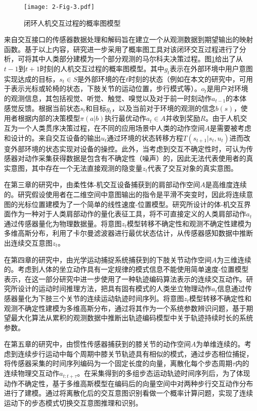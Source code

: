 \begin{figure}[htb]
    \centering
    \texttt{[image: 2-Fig-3.pdf]}
    \caption{闭环人机交互过程的概率图模型}
    \label{fig:2-3}
\end{figure}

来自交互接口的传感器数据处理和解码旨在建立一个从观测数据到期望输出的映射函数。基于以上内容，研究进一步采用了概率图工具对该闭环交互过程进行了分析，可将其中人类部分建模为一个部分观测的马尔科夫决策过程。图\ref{fig:2-3}给出了从$t-1$到$t+1$时刻的人机交互过程的概率图模型。其中${g_t}$表示在外部环境中用户意图实现达成的目标，${s_t} \in S$是外部环境的在$t$时刻的状态（例如在本文的研究中，可用于表示光标或轮椅的状态，下肢关节的运动位置，步行模式等）。${o_t}$是用户对环境的观测信息，其包括视觉、听觉、触觉、嗅觉以及对于前一时刻动作${a_{t - 1}}$的本体感觉反馈。根据当前状态${s_t}$和目标${g_t}$，以及当前对于环境的观测的信念$b(s)$，使用者根据内部的决策模型$\pi(a|b)$执行最优动作${a_t} \in A $并收到奖励$R$。由于人机交互为一个人类贯序决策过程，在不同的应用场景中人类的动作空间$A $是需要被考虑和设计的。来自交互设备的输出${u_t}$通过环境的状态转移方程$T({s_{t+1}}|{s_{t}},{u_{t}})$进而改变外部环境的状态实现对设备的操控。此外，当考虑到交互不确定性时，可认为传感器对动作采集获得数据是包含有不确定性（噪声）的，因此无法代表使用者的真实意图，其中存在一个无法直接观测的隐变量$z_t$代表了交互对象的真实意图。

在第三章的研究中，由柔性体-机交互设备捕获到的肩部动作空间$A $是高维度连续的。研究假设使用者在二维空间中意图输出的指令是平滑不突变时，因此将连续意图的光标位置建模为了一个简单的线性速度-位置模型。研究所设计的体-机交互界面作为一种对于人类肩部动作的量化表征工具，将不可直接定义的人类肩部动作${a_t}$通过传感器量化为物理数据量。将意图${z_t}$模型转移不确定性和观测不确定性建模为多维高斯分布，利用了卡尔曼滤波器进行最优状态估计，从传感器感知数据中推断出连续交互意图$z_t$。

在第四章的研究中，由光学运动捕捉系统捕获到的下肢关节动作空间$A $为三维连续的。考虑到人体的坐立动作具有一定规律的模式信息不能使用简单速度-位置模型表示，在这一部分研究中进一步使用了一种轨迹编码算法表示的连续交互动作。研究所设计的运动时间推理方法，把具有固有模式的人类坐立物理动作${a_t}$信息通过传感器量化为下肢三个关节的连续运动轨迹时间序列。将意图${z_t}$模型转移不确定性和观测不确定性建模为多维高斯分布，通过将其作为一个系统参数辨识问题，基于期望最大化算法从累积的观测数据中推断出轨迹编码模型中关于轨迹持续时长的系统参数。

在第五章的研究中，由惯性传感器捕获到的膝关节的动作空间$A $为单维连续的。考虑到连续步行运动中每个周期中膝关节轨迹具有相似的模式，通过步态相位捕捉，将传感器采集的时间序列编码为一个固定长度的向量，离散化每个步态周期$\tau$内的连续物理交互动作${a_{t:t+\tau}}$。在采集得到的多组步态运动轨迹时间序列后，为了体现动作不确定性，基于多维高斯模型在编码后的向量空间中对两种步行交互动作分布进行了建模。通过将离散化后的交互意图识别看做一个概率计算问题，实现了连续运动下的步态模式切换交互意图推理和识别。

